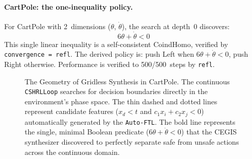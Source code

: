 \documentclass[9pt,a4paper]{article}
\theoremstyle{plain}
\theoremstyle{definition}
\theoremstyle{remark}
\begin{document}
\paragraph{CartPole: the one-inequality policy.}
For CartPole with 2~dimensions ($\theta$, $\dot\theta$), the search at depth~0 discovers:
\[
\boxed{\quad 6\theta + \dot\theta < 0 \quad}
\]
This single linear inequality is a self-consistent CoindHomo, verified by \texttt{convergence~=~refl}.  The derived policy is: push Left when $6\theta + \dot\theta < 0$, push Right otherwise.  Performance is verified to 500/500~steps by \texttt{refl}.

\begin{figure}[H]
\centering
{}
\caption{The Geometry of Gridless Synthesis in CartPole. The continuous \texttt{CSHRLLoop} searches for decision boundaries directly in the environment's phase space. The thin dashed and dotted lines represent candidate features ($x_d < t$ and $c_1 x_i + c_2 x_j < 0$) automatically generated by the \texttt{Auto-FTL}. The bold line represents the single, minimal Boolean predicate ($6\theta + \dot{\theta} < 0$) that the CEGIS synthesizer discovered to perfectly separate safe from unsafe actions across the continuous domain.}
\label{fig:gridless-geometry}
\end{figure}
\end{document}
